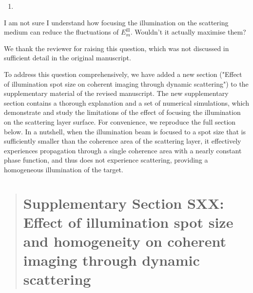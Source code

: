 \documentclass[12pt]{article}
\newenvironment{solved_reviewercomment}
    {\begin{tcolorbox}[width=\linewidth,colback=gray!5,colframe=solved_commentcolor!50,title=Reviewer Comment,left=5pt,right=5pt]}
    {\end{tcolorbox}}
\newenvironment{ourresponse}
    {\begin{tcolorbox}[width=\linewidth,breakable,enhanced,colback=gray!5,colframe=responsecolor!50,title=Response,left=5pt,right=5pt]}
    {\end{tcolorbox}}
\begin{document}
        
\begin{enumerate}[label=\arabic*., resume]
\item \leavevmode
\end{enumerate}
\vspace{-1em}
\begin{solved_reviewercomment}
    I am not sure I understand how focusing the illumination on the scattering medium can reduce the fluctuations of \(E^{\text{ill}}_m\). Wouldn't it actually maximise them?    
\end{solved_reviewercomment}
\begin{ourresponse}
We thank the reviewer for raising this question, which was not discussed in sufficient detail in the original manuscript.

To address this question comprehensively, we have added a new section ("Effect of illumination spot size on coherent imaging through dynamic scattering") to the supplementary material of the revised manuscript. The new supplementary section contains a thorough explanation and a set of numerical simulations, which demonstrate and study the limitations of the effect of focusing the illumination on the scattering layer surface. For convenience, we reproduce the full section below. In a nutshell, when the illumination beam is focused to a spot size that is sufficiently smaller than the coherence area of the scattering layer, it effectively experiences propagation through a single coherence area with a nearly constant phase function, and thus does not experience scattering, providing a homogeneous illumination of the target.
\begin{quote}
    \section*{Supplementary Section SXX: Effect of illumination spot size and homogeneity on coherent imaging through dynamic scattering}


\end{quote}
\end{ourresponse}
\end{document}
